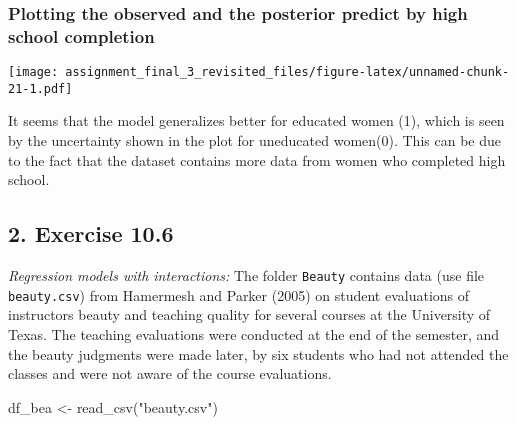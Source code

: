 \documentclass[
]{article}
\newenvironment{Shaded}{\begin{snugshade}}{\end{snugshade}}
\newcommand{\AttributeTok}[1]{\textcolor[rgb]{0.77,0.63,0.00}{#1}}
\newcommand{\ConstantTok}[1]{\textcolor[rgb]{0.00,0.00,0.00}{#1}}
\newcommand{\DecValTok}[1]{\textcolor[rgb]{0.00,0.00,0.81}{#1}}
\newcommand{\FloatTok}[1]{\textcolor[rgb]{0.00,0.00,0.81}{#1}}
\newcommand{\FunctionTok}[1]{\textcolor[rgb]{0.00,0.00,0.00}{#1}}
\newcommand{\NormalTok}[1]{#1}
\newcommand{\OtherTok}[1]{\textcolor[rgb]{0.56,0.35,0.01}{#1}}
\newcommand{\SpecialCharTok}[1]{\textcolor[rgb]{0.00,0.00,0.00}{#1}}
\newcommand{\StringTok}[1]{\textcolor[rgb]{0.31,0.60,0.02}{#1}}
\begin{document}
\hypertarget{plotting-the-observed-and-the-posterior-predict-by-high-school-completion}{%
\subsubsection{Plotting the observed and the posterior predict by high
school
completion}\label{plotting-the-observed-and-the-posterior-predict-by-high-school-completion}}

\begin{Shaded}
\end{Shaded}

\texttt{[image: assignment\_final\_3\_revisited\_files/figure-latex/unnamed-chunk-21-1.pdf]}

It seems that the model generalizes better for educated women (1), which
is seen by the uncertainty shown in the plot for uneducated women(0).
This can be due to the fact that the dataset contains more data from
women who completed high school.

\hypertarget{exercise-10.6}{%
\subsection{2. Exercise 10.6}\label{exercise-10.6}}

\emph{Regression models with interactions:} The folder \texttt{Beauty}
contains data (use file \texttt{beauty.csv}) from Hamermesh and Parker
(2005) on student evaluations of instructors beauty and teaching quality
for several courses at the University of Texas. The teaching evaluations
were conducted at the end of the semester, and the beauty judgments were
made later, by six students who had not attended the classes and were
not aware of the course evaluations.

\begin{Shaded}
\begin{Highlighting}[]
\NormalTok{df\_bea }\OtherTok{\textless{}{-}} \FunctionTok{read\_csv}\NormalTok{(}\StringTok{"beauty.csv"}\NormalTok{)}
\end{Highlighting}
\end{Shaded}
\end{document}
